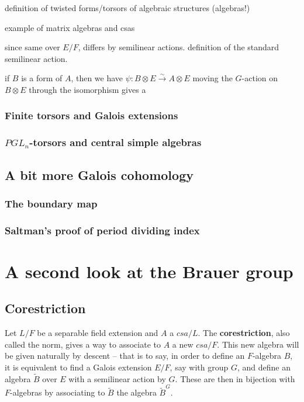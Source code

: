 \documentclass[12pt]{report}
\theoremstyle{plain}
\newcommand{\til}{\widetilde}
\newcommand{\Xb}[1]{\textbf{#1}\index{#1}}
\begin{document}
definition of twisted forms/torsors of algebraic structures (algebras!)

example of matrix algebras and csas

since same over $E/F$, differs by semilinear actions. definition of the
standard semilinear action.

if $B$ is a form of $A$, then we have $\psi: B \otimes E \overset\sim\to A \otimes E$
moving the $G$-action on $B \otimes E$ through the isomorphism gives a 

\subsection{Finite torsors and Galois extensions} 

\subsection{$PGL_n$-torsors and central simple algebras}

\section{A bit more Galois cohomology}

\subsection{The boundary map}

\subsection{Saltman's proof of period dividing index}

\chapter{A second look at the Brauer group}

\section{Corestriction}

Let $L/F$ be a separable field extension and $A$ a $csa/L$. The
\Xb{corestriction}, also called the norm, gives a way to associate to $A$ a
new $csa/F$. This new algebra will be given naturally by descent -- that is
to say, in order to define an $F$-algebra $B$, it is equivalent to find a
Galois extension $E/F$, say with group $G$, and define an algebra $\til B$
over $E$ with a semilinear action by $G$. These are then in bijection
with $F$-algebras by associating to $\til B$ the algebra $\til B^G$.
\end{document}
